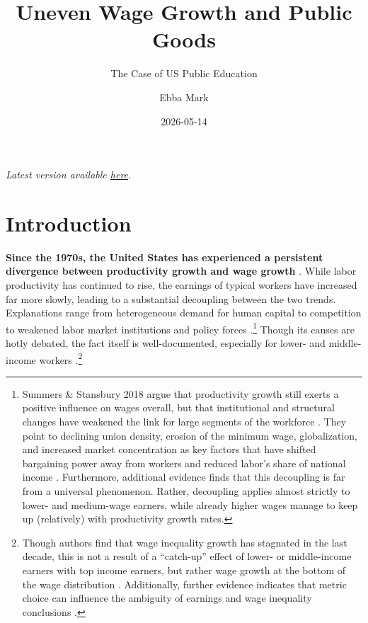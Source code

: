 \documentclass[
  10pt,
]{article}
\title{Uneven Wage Growth and Public Goods}
\subtitle{The Case of US Public Education}
\author{Ebba Mark}
\date{2026-05-14}
\begin{document}
\maketitle

\begin{center}
\end{center}
\begin{abstract}

\end{abstract}
\textit{Latest version available \href{https://ebbam.github.io/pub_fin_schools/code/regressions.pdf}{here}.}


\section{Introduction}\label{introduction}

\textbf{Since the 1970s, the United States has experienced a persistent
divergence between productivity growth and wage growth}
\autocite{hoffmann2020,stansbury,economicpolicyinstitute,elsby2013}.
While labor productivity has continued to rise, the earnings of typical
workers have increased far more slowly, leading to a substantial
decoupling between the two trends. Explanations range from heterogeneous
demand for human capital
\autocite{autor2014,katz1992,acemoglu2012,autor2011,autor_growth_2013}
to competition \autocite{stansbury,deb2022,yeh2022,azar2022,wilmers2018}
to weakened labor market institutions and policy forces
\autocite{egger2019,lee1999,mishel2021,barkai2020,autor2016,card2001,bivens2013,stansbury2020}.\footnote{Summers
  \& Stansbury 2018 argue that productivity growth still exerts a
  positive influence on wages overall, but that institutional and
  structural changes have weakened the link for large segments of the
  workforce \autocite{summers2018,stansbury}. They point to declining
  union density, erosion of the minimum wage, globalization, and
  increased market concentration as key factors that have shifted
  bargaining power away from workers and reduced labor's share of
  national income \autocite{autor2014}. Furthermore, additional evidence
  finds that this decoupling is far from a universal phenomenon. Rather,
  decoupling applies almost strictly to lower- and medium-wage earners,
  while already higher wages manage to keep up (relatively) with
  productivity growth rates.} Though its causes are hotly debated, the
fact itself is well-documented, especially for lower- and middle-income
workers \autocite{komlos2018}.\footnote{Though authors find that wage
  inequality growth has stagnated in the last decade, this is not a
  result of a ``catch-up'' effect of lower- or middle-income earners
  with top income earners, but rather wage growth at the bottom of the
  wage distribution \autocite{aeppli2022}. Additionally, further
  evidence indicates that metric choice can influence the ambiguity of
  earnings and wage inequality conclusions \autocite{parolin2025}.}
\end{document}
